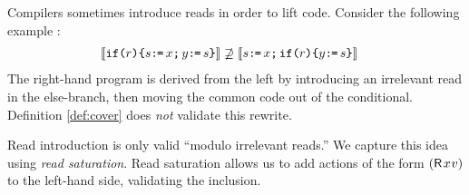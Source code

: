 













Compilers sometimes introduce reads in order to lift code.  Consider the
following example \cite[.5]{SevcikThesis}:
\begin{align*}
  \llbracket\texttt{if}\allowbreak\texttt{(}r\texttt{)} \allowbreak\texttt{\{} s \texttt{:}\mkern-1mu\texttt{=}\, x \texttt{;}\,\allowbreak y \texttt{:}\mkern-1mu\texttt{=}\, s \texttt{\}}\rrbracket
  &\not\supseteq
  \llbracket s \texttt{:}\mkern-1mu\texttt{=}\, x \texttt{;}\,\allowbreak \texttt{if}\allowbreak\texttt{(}r\texttt{)} \allowbreak\texttt{\{} y \texttt{:}\mkern-1mu\texttt{=}\, s \texttt{\}}\rrbracket
\end{align*}
The right-hand program is derived from the left by introducing an irrelevant
read in the else-branch, then moving the common code out of the
conditional.  Definition \ref{def:cover} does \emph{not} validate this rewrite.

Read introduction is only valid ``modulo irrelevant reads.'' We capture this
idea using \emph{read saturation}.  Read saturation allows us to add actions
of the form $(\DR{x}{v})$ to the left-hand side, validating the inclusion.

